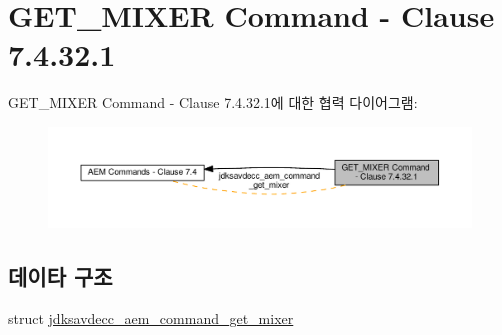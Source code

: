 \hypertarget{group__command__get__mixer}{}\section{G\+E\+T\+\_\+\+M\+I\+X\+ER Command -\/ Clause 7.4.32.1}
\label{group__command__get__mixer}
G\+E\+T\+\_\+\+M\+I\+X\+ER Command -\/ Clause 7.4.32.1에 대한 협력 다이어그램\+:
\nopagebreak
\begin{figure}[H]
\begin{center}
\leavevmode
\includegraphics[width=350pt]{group__command__get__mixer}
\end{center}
\end{figure}
\subsection*{데이타 구조}
\begin{DoxyCompactItemize}
\item 
struct \hyperlink{structjdksavdecc__aem__command__get__mixer}{jdksavdecc\+\_\+aem\+\_\+command\+\_\+get\+\_\+mixer}
\end{DoxyCompactItemize}
